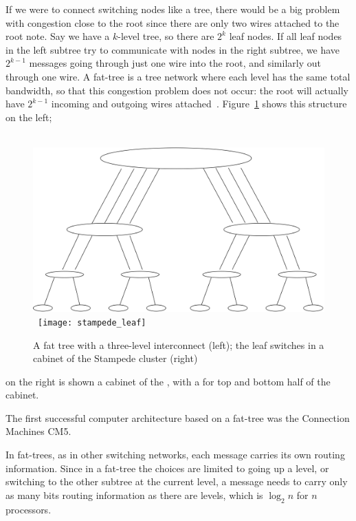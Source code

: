 If we were to connect switching nodes like a tree, there would be a
big problem with congestion close to the root since there are only two
wires attached to the root note.  Say we have a $k$-level tree, so
there are $2^k$ leaf nodes.  If all leaf nodes in the left subtree try
to communicate with nodes in the right subtree, we have $2^{k-1}$
messages going through just one wire into the root, and similarly out
through one wire.  A fat-tree is a tree network where each level has
the same total bandwidth, so that this congestion problem does not
occur: the root will actually have $2^{k-1}$ incoming and outgoing
wires attached~\cite{Greenberg89randomizedrouting}.
Figure~\ref{fig:fattree} shows this structure on the left;
\begin{figure}
\hbox{%
  \includegraphics[scale=.12]{graphics/fattree5}
  \kern20pt
  \texttt{[image: stampede\_leaf]}
}
  \caption{A fat tree with a three-level interconnect (left);
  the leaf switches in a cabinet of the Stampede cluster (right)}
  \label{fig:fattree}
\end{figure}
on the right is shown a cabinet of the ,
with a  for top and bottom half of the cabinet.

The first successful computer
architecture based on a fat-tree was the Connection Machines CM5.

In fat-trees, as in other switching networks, each message carries its
own routing information. Since in a fat-tree the choices are limited
to going up a level, or switching to the other subtree at the
current level, a message needs to carry only as many bits routing
information as there are levels, which is $\log_2n$ for $n$
processors.

